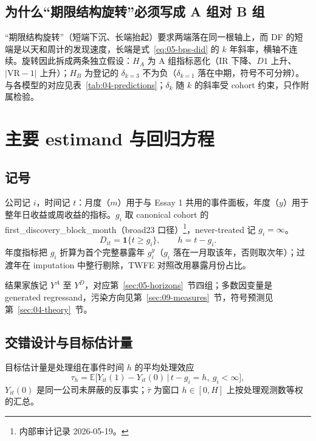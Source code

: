 \documentclass[a4paper,11pt]{ctexart}
\begin{document}
\subsection{为什么“期限结构旋转”必须写成 A 组对 B 组}\label{sec:05-rotation}

“期限结构旋转”（短端下沉、长端抬起）要求两端落在同一根轴上，而 DF 的短端是以天和周计的发现速度，长端是式~\eqref{eq:05-bps-did} 的 $k$ 年斜率，横轴不连续。旋转因此拆成两条独立假设：$H_A$ 为 A 组指标恶化（IR 下降、$D1$ 上升、$\lvert\mathrm{VR}-1\rvert$ 上升）；$H_B$ 为登记的 $\delta_{k=3}$ 不为负（$\delta_{k=1}$ 落在中期，符号不可分辨）。与各模型的对应见表~\ref{tab:04-predictions}；$\delta_k$ 随 $k$ 的斜率受 cohort 约束，只作附属检验。
\clearpage

\section{主要 estimand 与回归方程}\label{sec:06-estimands}

\subsection{记号}\label{sec:06-notation}

公司记 $i$，时间记 $t$：月度（$m$）用于与 Essay 1 共用的事件面板，年度（$y$）用于整年日收益或周收益的指标。$g_i$ 取 canonical cohort 的 first\_discovery\_block\_month（broad23 口径）\footnote{内部审计记录 2026-05-19。}，never-treated 记 $g_i=\infty$。
\begin{equation}\label{eq:06-D}
D_{it}=\mathbf{1}\{t\ge g_i\},\qquad h=t-g_i .
\end{equation}
年度指标把 $g_i$ 折算为首个完整暴露年 $g_i^{y}$（$g_i$ 落在一月取该年，否则取次年）；过渡年在 imputation 中整行剔除，TWFE 对照改用暴露月份占比。

结果家族记 $Y^{A}$ 至 $Y^{D}$，对应第~\ref{sec:05-horizons}~节四组；多数因变量是 generated regressand，污染方向见第~\ref{sec:09-measures}~节，符号预测见第~\ref{sec:04-theory}~节。

\subsection{交错设计与目标估计量}\label{sec:06-staggered}

目标估计量是处理组在事件时间 $h$ 的平均处理效应
\begin{equation}\label{eq:06-tau-h}
\tau_h=\mathbb{E}\big[Y_{it}(1)-Y_{it}(0)\,\big|\,t-g_i=h,\ g_i<\infty\big],
\end{equation}
$Y_{it}(0)$ 是同一公司未屏蔽的反事实；$\bar\tau$ 为窗口 $h\in[0,H]$ 上按处理观测数等权的汇总。
\end{document}
